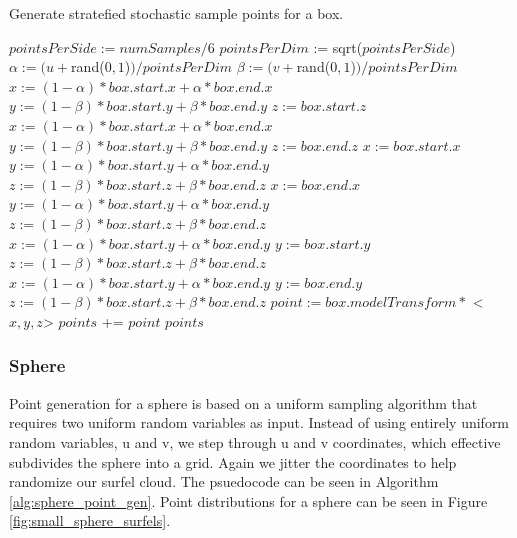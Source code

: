 \begin{algorithm}
\captionfont
\caption[Box point generation]{Generate stratefied stochastic sample points for a box.}
\label{alg:box_point_gen}
{\fontsize{10}{9}\selectfont
\begin{algorithmic}
      \State $pointsPerSide := numSamples / 6$
      \State $pointsPerDim$ := sqrt($pointsPerSide$)
               \State $\alpha := (u + $rand($0,1$)$) / pointsPerDim$
               \State $\beta := (v + $rand($0,1$)$) / pointsPerDim$
                  \State $x := (1-\alpha) * box.start.x + \alpha * box.end.x$
                  \State $y := (1-\beta) * box.start.y + \beta * box.end.y$
                  \State $z := box.start.z$
                  \State $x := (1-\alpha) * box.start.x + \alpha * box.end.x$
                  \State $y := (1-\beta) * box.start.y + \beta * box.end.y$
                  \State $z := box.end.z$
                  \State $x := box.start.x$
                  \State $y := (1-\alpha) * box.start.y + \alpha * box.end.y$
                  \State $z := (1-\beta) * box.start.z + \beta * box.end.z$
                  \State $x := box.end.x$
                  \State $y := (1-\alpha) * box.start.y + \alpha * box.end.y$
                  \State $z := (1-\beta) * box.start.z + \beta * box.end.z$
                  \State $x := (1-\alpha) * box.start.y + \alpha * box.end.y$
                  \State $y := box.start.y$
                  \State $z := (1-\beta) * box.start.z + \beta * box.end.z$
                  \State $x := (1-\alpha) * box.start.y + \alpha * box.end.y$
                  \State $y := box.end.y$
                  \State $z := (1-\beta) * box.start.z + \beta * box.end.z$
               \EndIf
               \State $point := box.modelTransform *$ \textless$x, y, z$\textgreater
               \State $points$ += $point$
            \EndFor
         \EndFor
      \EndFor
      \State \Return $points$
   \EndFunction
\end{algorithmic}
}
\end{algorithm}

\subsubsection{Sphere}
\label{sec:sphere_point_gen}
Point generation for a sphere is based on a uniform sampling algorithm \cite{bib:pbr} that requires two uniform random variables as input. Instead of using entirely uniform random variables, u and v, we step through u and v coordinates, which effective subdivides the sphere into a grid. Again we jitter the coordinates to help randomize our surfel cloud.
The psuedocode can be seen in Algorithm \ref{alg:sphere_point_gen}.
Point distributions for a sphere can be seen in Figure \ref{fig:small_sphere_surfels}.

